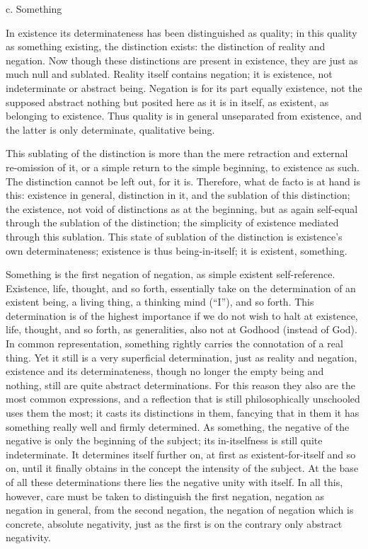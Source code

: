 c. Something

In existence its determinateness has been distinguished as quality;
in this quality as something existing, the distinction exists:
the distinction of reality and negation.
Now though these distinctions are present in existence,
they are just as much null and sublated.
Reality itself contains negation;
it is existence, not indeterminate or abstract being.
Negation is for its part equally existence,
not the supposed abstract nothing
but posited here as it is in itself,
as existent, as belonging to existence.
Thus quality is in general unseparated from existence,
and the latter is only determinate, qualitative being.

This sublating of the distinction is more than
the mere retraction and external re-omission of it,
or a simple return to the simple beginning,
to existence as such.
The distinction cannot be left out, for it is.
Therefore, what de facto is at hand is this:
existence in general, distinction in it,
and the sublation of this distinction;
the existence, not void of distinctions as at the beginning,
but as again self-equal through the sublation of the distinction;
the simplicity of existence mediated through this sublation.
This state of sublation of the distinction is
existence's own determinateness;
existence is thus being-in-itself;
it is existent, something.

Something is the first negation of negation,
as simple existent self-reference.
Existence, life, thought, and so forth,
essentially take on the determination of an existent being,
a living thing, a thinking mind (“I”), and so forth.
This determination is of the highest importance
if we do not wish to halt at existence, life, thought,
and so forth, as generalities, also not at Godhood (instead of God).
In common representation, something rightly carries
the connotation of a real thing.
Yet it still is a very superficial determination,
just as reality and negation, existence and its determinateness,
though no longer the empty being and nothing,
still are quite abstract determinations.
For this reason they also are the most common expressions,
and a reflection that is still philosophically
unschooled uses them the most;
it casts its distinctions in them,
fancying that in them it has something
really well and firmly determined.
As something, the negative of the negative is
only the beginning of the subject;
its in-itselfness is still quite indeterminate.
It determines itself further on,
at first as existent-for-itself and so on,
until it finally obtains in the concept
the intensity of the subject.
At the base of all these determinations
there lies the negative unity with itself.
In all this, however, care must be taken
to distinguish the first negation, negation as negation in general,
from the second negation, the negation of negation
which is concrete, absolute negativity,
just as the first is on the contrary only abstract negativity.


